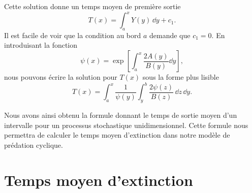 \documentclass[openany,a4paper,12pt]{article}
\begin{document}
%
Cette solution donne un temps moyen de première sortie
%
\begin{equation}\label{echap_sol_T_avec_c1}
	T(x) = \int_a^x Y(y) \, \dd y + c_1.
\end{equation}
%
Il est facile de voir que la condition au bord $a$ demande que $c_1=0$. En introduisant la fonction   
%
\begin{equation}\label{echap_psi_x}
	\psi(x) = \exp\left[ \int_a^x \frac{2A(y)}{B(y)} \dd y \right] ,
\end{equation}
%
nous pouvons écrire la solution pour $T(x)$ sous la forme plus lisible
%
\begin{equation}\label{echap_sol_T_sans_c1}
	T(x) = \int_a^x \frac{1}{\psi(y)} \int_y^b \frac{2\psi(z)}{B(z)} \, \dd z \, \dd y.
\end{equation}
%

\par Nous avons ainsi obtenu la formule donnant le temps de sortie moyen d'un intervalle pour un processus stochastique unidimensionnel. Cette formule nous permettra de calculer le temps moyen d'extinction dans notre modèle de prédation cyclique.


\section{Temps moyen d'extinction}
\end{document}
